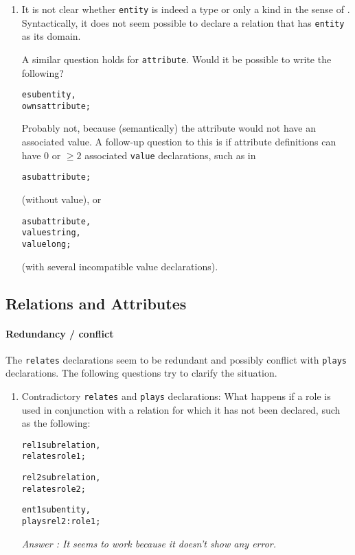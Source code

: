\documentclass[runningheads]{llncs}
\begin{document}
\begin{enumerate}

	


\item It is not clear whether \texttt{entity} is indeed a type or only a kind
  in the sense of . Syntactically, it does not
  seem possible to declare a relation that has \texttt{entity} as its domain.

  A similar question holds for \texttt{attribute}. Would it be possible to
  write the following?

  \begin{alltt}
  e sub entity,
    owns attribute;
  \end{alltt}

  Probably not, because (semantically) the attribute would not have an
  associated value. A follow-up question to this is if attribute definitions
  can have 0 or $\geq 2$ associated \texttt{value} declarations, such as in
  \begin{alltt}
    a sub attribute;
  \end{alltt}
  (without value),  or
  \begin{alltt}
    a sub attribute,
    value string,
    value long;
  \end{alltt}
  (with several incompatible value declarations).

\end{enumerate}

\subsection{Relations and Attributes}\label{sec:questions_rels_attribs}

\paragraph{Redundancy / conflict} The \texttt{relates} declarations seem to be
redundant and possibly conflict with \texttt{plays} declarations. The
following questions try to clarify the situation.

\begin{enumerate}

\item Contradictory \texttt{relates} and \texttt{plays} declarations: What
  happens if a role is used in conjunction with a relation for which it has
  not been declared, such as the following:

  \begin{alltt}
rel1 sub relation,
  relates role1;

rel2 sub relation,
  relates role2;

ent1 sub entity,
  plays rel2:role1;
  \end{alltt}

\emph{Answer : It seems to work because it doesn't show any error. }


\end{enumerate}
\end{document}
